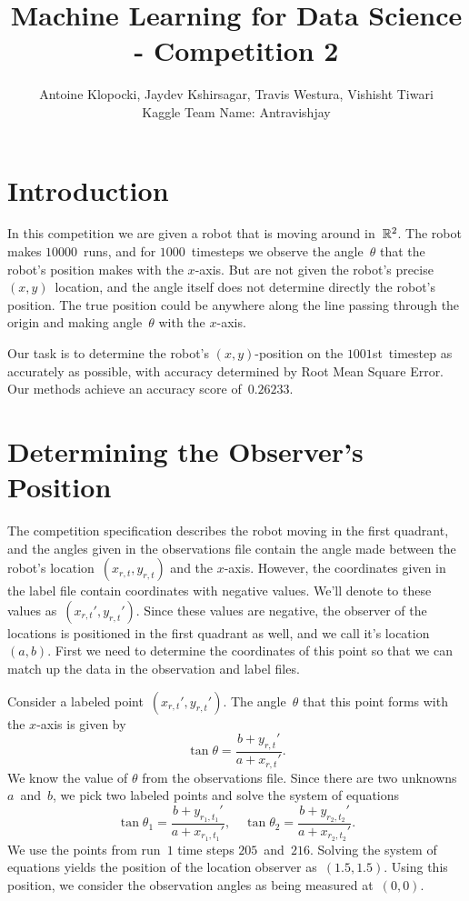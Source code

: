 \documentclass[twoside]{article}
\title{Machine Learning for Data Science - Competition 2}
\author{Antoine Klopocki, Jaydev Kshirsagar, Travis Westura, Vishisht Tiwari\\Kaggle Team Name: Antravishjay}
\date{\vspace{-5ex}} %
\begin{document}
\maketitle
\thispagestyle{empty}

\section{Introduction}\label{sec:introduction}

In this competition we are given a robot that is moving around in~$\mathbb{R}^2$.
The robot makes $\num{10000}$~runs, and for $\num{1000}$~timesteps we observe the angle~$\theta$ that the robot's position makes with the $x$-axis.
But are not given the robot's precise ${(x, y)}$~location, and the angle itself does not determine directly the robot's position.
The true position could be anywhere along the line passing through the origin and making angle~$\theta$ with the $x$-axis.

Our task is to determine the robot's ${(x, y)}$-position on the $\num{1001}$st~timestep as accurately as possible, with accuracy determined by Root Mean Square Error.
Our methods achieve an accuracy score of~$\bm{0.26233}$.

\section{Determining the Observer's Position}\label{sec:determ-observ-posit}

The competition specification describes the robot moving in the first quadrant, and the angles given in the observations file contain the angle made between the robot's location~${(x_{r, t}, y_{r, t})}$ and the $x$-axis.
However, the coordinates given in the label file contain coordinates with negative values.
We'll denote to these values as~${(x_{r, t}', y_{r, t}')}$.
Since these values are negative, the observer of the locations is positioned in the first quadrant as well, and we call it's location~${(a, b)}$.
First we need to determine the coordinates of this point so that we can match up the data in the observation and label files.

Consider a labeled point~${(x_{r, t}', y_{r, t}')}$.
The angle~$\theta$ that this point forms with the $x$-axis is given by
\begin{equation*}
  \tan\theta = \frac{b + y_{r, t}'}{a + x_{r, t}'}.
\end{equation*}
We know the value of $\theta$ from the observations file.
Since there are two unknowns $a$~and~$b$, we pick two labeled points and solve the system of equations
\begin{equation*}
  \tan\theta_1 = \frac{b + y_{r_1, t_1}'}{a + x_{r_1, t_1}'}, \quad \tan\theta_2 = \frac{b + y_{r_2, t_2}'}{a + x_{r_2, t_2}'}.
\end{equation*}
We use the points from run~$1$ time steps $205$~and~$216$.
Solving the system of equations yields the position of the location observer as~$(1.5, 1.5)$.
Using this position, we consider the observation angles as being measured at~$(0, 0)$.
\end{document}
